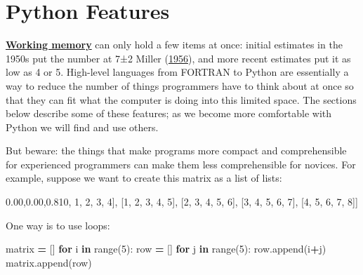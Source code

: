 \documentclass[
]{krantz}
\makeatletter
\newenvironment{Shaded}{\begin{snugshade}}{\end{snugshade}}
\newcommand{\BuiltInTok}[1]{#1}
\newcommand{\ControlFlowTok}[1]{\textcolor[rgb]{0.13,0.29,0.53}{\textbf{#1}}}
\newcommand{\DecValTok}[1]{\textcolor[rgb]{0.00,0.00,0.81}{#1}}
\newcommand{\KeywordTok}[1]{\textcolor[rgb]{0.13,0.29,0.53}{\textbf{#1}}}
\newcommand{\NormalTok}[1]{#1}
\newcommand{\OperatorTok}[1]{\textcolor[rgb]{0.81,0.36,0.00}{\textbf{#1}}}
\newenvironment{kframe}{%
\medskip{}
\setlength{\fboxsep}{.8em}
 \def\at@end@of@kframe{}%
 \ifinner\ifhmode%
  \def\at@end@of@kframe{\end{minipage}}%
  \begin{minipage}{\columnwidth}%
 \fi\fi%
 \def\FrameCommand##1{\hskip\@totalleftmargin \hskip-\fboxsep
 \colorbox{shadecolor}{##1}\hskip-\fboxsep
     \hskip-\linewidth \hskip-\@totalleftmargin \hskip\columnwidth}%
 \MakeFramed {\advance\hsize-\width
   \@totalleftmargin\z@ \linewidth\hsize
   \@setminipage}}%
 {\par\unskip\endMakeFramed%
 \at@end@of@kframe}
\renewenvironment{Shaded}{\begin{kframe}}{\end{kframe}}
\newcommand{\gref}[2]{\hyperlink{#2}{\textbf{#1}}}
\makeatother
\begin{document}
\hypertarget{style-features}{%
\section{Python Features}\label{style-features}}

\gref{Working memory}{working\_memory} can only hold a few items at once:
initial estimates in the 1950s put the number at 7±2 Miller (\protect\hyperlink{ref-Mill1956}{1956}),
and more recent estimates put it as low as 4 or 5.
High-level languages from FORTRAN to Python
are essentially a way to reduce the number of things programmers have to think about at once
so that they can fit what the computer is doing into this limited space.
The sections below describe some of these features;
as we become more comfortable with Python we will find and use others.

But beware:
the things that make programs more compact and comprehensible for experienced programmers
can make them less comprehensible for novices.
For example,
suppose we want to create this matrix as a list of lists:

\begin{Shaded}
\begin{Highlighting}[]
\NormalTok{[[}\DecValTok{0}\NormalTok{, }\DecValTok{1}\NormalTok{, }\DecValTok{2}\NormalTok{, }\DecValTok{3}\NormalTok{, }\DecValTok{4}\NormalTok{],}
\NormalTok{ [}\DecValTok{1}\NormalTok{, }\DecValTok{2}\NormalTok{, }\DecValTok{3}\NormalTok{, }\DecValTok{4}\NormalTok{, }\DecValTok{5}\NormalTok{],}
\NormalTok{ [}\DecValTok{2}\NormalTok{, }\DecValTok{3}\NormalTok{, }\DecValTok{4}\NormalTok{, }\DecValTok{5}\NormalTok{, }\DecValTok{6}\NormalTok{],}
\NormalTok{ [}\DecValTok{3}\NormalTok{, }\DecValTok{4}\NormalTok{, }\DecValTok{5}\NormalTok{, }\DecValTok{6}\NormalTok{, }\DecValTok{7}\NormalTok{],}
\NormalTok{ [}\DecValTok{4}\NormalTok{, }\DecValTok{5}\NormalTok{, }\DecValTok{6}\NormalTok{, }\DecValTok{7}\NormalTok{, }\DecValTok{8}\NormalTok{]]}
\end{Highlighting}
\end{Shaded}

One way is to use loops:

\begin{Shaded}
\begin{Highlighting}[]
\NormalTok{matrix }\OperatorTok{=}\NormalTok{ []}
\ControlFlowTok{for}\NormalTok{ i }\KeywordTok{in} \BuiltInTok{range}\NormalTok{(}\DecValTok{5}\NormalTok{):}
\NormalTok{    row }\OperatorTok{=}\NormalTok{ []}
    \ControlFlowTok{for}\NormalTok{ j }\KeywordTok{in} \BuiltInTok{range}\NormalTok{(}\DecValTok{5}\NormalTok{):}
\NormalTok{        row.append(i}\OperatorTok{+}\NormalTok{j)}
\NormalTok{    matrix.append(row)}
\end{Highlighting}
\end{Shaded}
\end{document}
